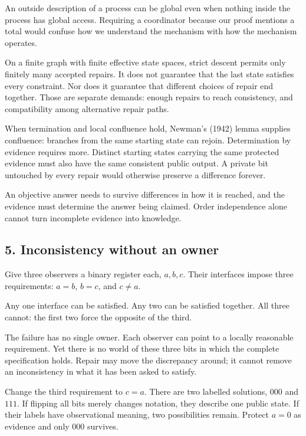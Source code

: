 \documentclass[
  11pt,
]{article}
\begin{document}
An outside description of a process can be global even when nothing
inside the process has global access. Requiring a coordinator because
our proof mentions a total would confuse how we understand the mechanism
with how the mechanism operates.

On a finite graph with finite effective state spaces, strict descent
permits only finitely many accepted repairs. It does not guarantee that
the last state satisfies every constraint. Nor does it guarantee that
different choices of repair end together. Those are separate demands:
enough repairs to reach consistency, and compatibility among alternative
repair paths.

When termination and local confluence hold, Newman's (1942) lemma
supplies confluence: branches from the same starting state can rejoin.
Determination by evidence requires more. Distinct starting states
carrying the same protected evidence must also have the same consistent
public output. A private bit untouched by every repair would otherwise
preserve a difference forever.

An objective answer needs to survive differences in how it is reached,
and the evidence must determine the answer being claimed. Order
independence alone cannot turn incomplete evidence into knowledge.

\subsection{5. Inconsistency without an
owner}\label{inconsistency-without-an-owner}

Give three observers a binary register each, \(a,b,c\). Their interfaces
impose three requirements: \(a=b\), \(b=c\), and \(c\ne a\).

Any one interface can be satisfied. Any two can be satisfied together.
All three cannot: the first two force the opposite of the third.

The failure has no single owner. Each observer can point to a locally
reasonable requirement. Yet there is no world of these three bits in
which the complete specification holds. Repair may move the discrepancy
around; it cannot remove an inconsistency in what it has been asked to
satisfy.

Change the third requirement to \(c=a\). There are two labelled
solutions, \(000\) and \(111\). If flipping all bits merely changes
notation, they describe one public state. If their labels have
observational meaning, two possibilities remain. Protect \(a=0\) as
evidence and only \(000\) survives.
\end{document}

